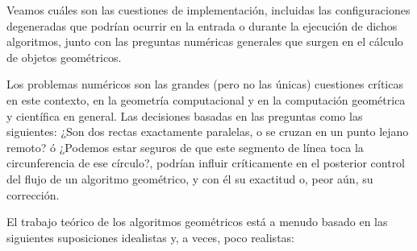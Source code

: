 Veamos cuáles son las cuestiones de implementación, incluidas las configuraciones degeneradas que podrían ocurrir en la entrada o durante la ejecución de dichos algoritmos, junto con las preguntas numéricas generales que surgen en el cálculo de objetos geométricos. 

\vspace{0.3cm}

Los problemas numéricos son las grandes (pero no las únicas) cuestiones críticas en este contexto, en la geometría computacional y en la computación geométrica y científica en general. 
Las decisiones basadas en las preguntas como las siguientes: ¿Son dos rectas exactamente paralelas, o se cruzan en un punto lejano remoto? ó ¿Podemos estar seguros de que este segmento de línea toca la circunferencia de ese círculo?, podrían influir críticamente en el posterior control del flujo de un algoritmo geométrico, y con él su exactitud o, peor aún, su corrección.

\vspace{0.3cm} 

El trabajo teórico de los algoritmos geométricos está a menudo basado en las siguientes suposiciones idealistas y, a veces, poco realistas: 

